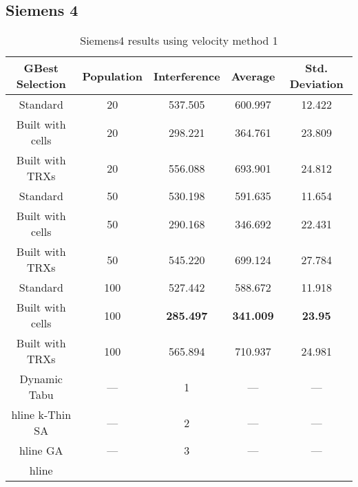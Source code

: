 \subsection{Siemens 4}
\begin{table}[H]
\centering
	\begin{tabular}{| c | c | c | c | c |}
	\hline
	GBest Selection & Population & Interference & Average & Std. Deviation\\ \hline
	Standard & 20 & 537.505 & 600.997 & 12.422\\ \hline
	Built with cells & 20 & 298.221 & 364.761 & 23.809\\ \hline
	Built with TRXs & 20 & 556.088 & 693.901 & 24.812\\ \hline
	Standard & 50 & 530.198 & 591.635 & 11.654\\ \hline
	Built with cells & 50 & 290.168 & 346.692 & 22.431\\ \hline
	Built with TRXs & 50 & 545.220 & 699.124 & 27.784\\ \hline
	Standard & 100 & 527.442 & 588.672 & 11.918\\ \hline
	Built with cells & 100 & \textbf{285.497} & \textbf{341.009} & \textbf{23.95}\\ \hline
	Built with TRXs & 100 & 565.894 & 710.937 & 24.981\\ \hline
    Dynamic Tabu & --- & 1 & --- & --- \\hline
    k-Thin SA & --- & 2 & --- & --- \\hline
    GA & --- & 3 & --- & --- \\hline
	\end{tabular}
\caption{Siemens4 results using velocity method 1}
\label{tab:siem4m1}
\end{table}
